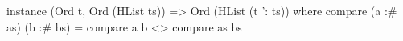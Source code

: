 \begin{code}
instance (Ord t, Ord (HList ts))
    => Ord (HList (t ': ts)) where
  compare (a :# as) (b :# bs) =
    compare a b <> compare as bs
\end{code}
